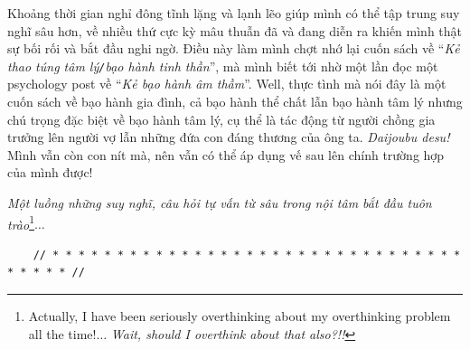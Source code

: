 \documentclass[12pt]{article}
\numberwithin{equation}{section}
\begin{document}
Khoảng thời gian nghỉ đông tĩnh lặng và lạnh lẽo giúp mình có thể tập trung suy nghĩ sâu hơn, về nhiều thứ cực kỳ mâu thuẫn đã và đang diễn ra khiến mình thật sự bối rối và bắt đầu nghi ngờ. Điều này làm mình chợt nhớ lại cuốn sách \cite{Bancroft2003} về ``\textit{Kẻ thao túng tâm lý\texttt{/}bạo hành tinh thần}'', mà mình biết tới nhờ một lần đọc một psychology post về ``\textit{Kẻ bạo hành âm thầm}''. Well, thực tình mà nói đây là một cuốn sách về bạo hành gia đình, cả bạo hành thể chất lẫn bạo hành tâm lý nhưng chú trọng đặc biệt về bạo hành tâm lý, cụ thể là tác động từ người chồng gia trưởng lên người vợ lẫn những đứa con đáng thương của ông ta. \textit{Daijoubu desu!} Mình vẫn còn con nít mà, nên vẫn có thể áp dụng vế sau lên chính trường hợp của mình được!

\textit{Một luồng những suy nghĩ, câu hỏi tự vấn từ sâu trong nội tâm bắt đầu tuôn trào}\footnote{Actually, I have been seriously overthinking about my overthinking problem all the time!$\ldots$ \textit{Wait, should I overthink about that also?!!}}$\ldots$

\begin{verbatim}
    // * * * * * * * * * * * * * * * * * * * * * * * * * * * * * * * * * * * * * //
\end{verbatim}
\end{document}
